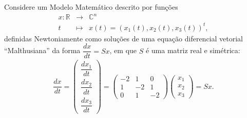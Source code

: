 Considere um Modelo Matemático descrito por funções
\[\begin{array}{rcl}
x: \mathbb{R} &\to& \mathbb{C}^n \\
t &\mapsto& x(t) = (x_1(t), x_2(t), x_3(t))^t,
\end{array}\]
definidas Newtoniamente como soluções de uma equação diferencial vetorial ``Malthusiana'' da forma \(\dfrac{dx}{dt} = Sx\), em que \(S\) é uma matriz real e simétrica:
\begin{eqnarray}\label{eq:edoprova03q01}
\dfrac{dx}{dt} =
\left(\begin{array}{c}
\dfrac{dx_1}{dt} \\[0.5cm]
\dfrac{dx_2}{dt} \\[0.5cm]
\dfrac{dx_3}{dt}
\end{array}\right) =
\left(\begin{array}{ccc}
-2 & 1 & 0 \\
1 & -2 & 1 \\
0 & 1 & -2
\end{array}\right)
\left(\begin{array}{c}
x_1 \\
x_2 \\
x_3
\end{array}\right)
= S x.
\end{eqnarray}


